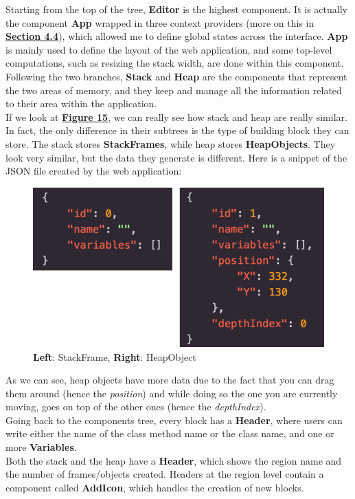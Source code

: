 \documentclass[]{usiinfbachelorproject}
\begin{document}
\bigskip

\noindent Starting from the top of the tree, \textbf{Editor} is the highest component. It is actually the component \textbf{App} wrapped in three context providers (more on this in \hyperref[storing states]{\textbf{Section 4.4}}), which allowed me to define global states across the interface. \textbf{App} is mainly used to define the layout of the web application, and some top-level computations, such as resizing the stack width, are done within this component.\\
Following the two branches, \textbf{Stack} and \textbf{Heap} are the components that represent the two areas of memory, and they keep and manage all the information related to their area within the application.\\
If we look at \textbf{\hyperref[tree]{Figure 15}}, we can really see how stack and heap are really similar. In fact, the only difference in their subtrees is the type of building block they can store. The stack stores \textbf{StackFrames}, while heap stores \textbf{HeapObjects}. They look very similar, but the data they generate is different. Here is a snippet of the JSON file created by the web application:\\

\begin{figure}[h!]
\centering
\includegraphics[scale=.3]{figures/blocks_data.png}
\caption {\textbf{Left}: StackFrame, \textbf{Right}: HeapObject}
\label{tree}
\end{figure}

\noindent As we can see, heap objects have more data due to the fact that you can drag them around (hence the \emph{position}) and while doing so the one you are currently moving, goes on top of the other ones (hence the \emph{depthIndex}).\\
Going back to the components tree, every block has a \textbf{Header}, where users can write either the name of the class method name or the class name, and one or more \textbf{Variables}.\\
Both the stack and the heap have a \textbf{Header}, which shows the region name and the number of frames/objects created. Headers at the region level contain a component called \textbf{AddIcon}, which handles the creation of new blocks.
\end{document}
